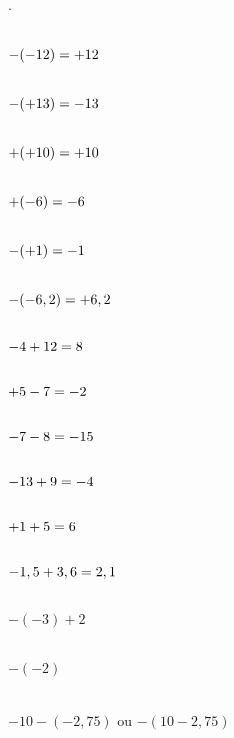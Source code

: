 . 

\begin{multicols}{6}
    \cnt\\ 
    $-(-12)\\=+12$

    \cnt\\
    $-(+13)\\=-13$

    \cnt\\
    $+(+10)\\=+10$

    \cnt\\
    $+(-6)\\=-6$

    \cnt\\ 
    $-(+1)\\=-1$

    \cnt\\
    $-(-6,2)\\=+6,2$
\end{multicols}
\vspace{1em}
\begin{multicols}{6}
    \cnt\\
    $-4+12\\=8$

    \cnt\\
    $+5-7\\=-2$

    \cnt\\ 
    $-7-8\\=-15$

    \cnt\\
    $-13+9\\=-4$

    \cnt\\
    $+1+5\\=6$

    \cnt\\
    $-1,5+3,6\\=2,1$
\end{multicols}


\begin{multicols}{3}
    \cnt
    \\$-(-3)+2$

    \cnt
    \\$-(-2)$

    \cnt
    \\$-10-(-2,75)$ ou $-(10-2,75)$
\end{multicols}

